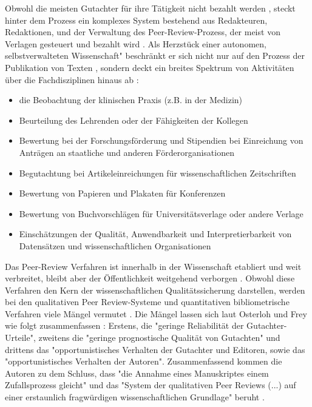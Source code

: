 Obwohl die meisten Gutachter für ihre Tätigkeit nicht bezahlt werden \cite{yiotis_2013_open}, steckt hinter dem Prozess ein komplexes System bestehend aus Redakteuren, Redaktionen, und der Verwaltung des Peer-Review-Prozess, der meist von Verlagen gesteuert und bezahlt wird \cite{Bargheer_2015} \cite{mueller_2009_peerreview} \cite{Baggs_2006}. Als Herzstück einer autonomen, selbstverwalteten Wissenschaft" \cite{suchen_Hornbostel_2006} beschränkt er sich nicht nur auf den Prozess der Publikation von Texten \cite{mueller_2009_peerreview}, sondern deckt ein breites Spektrum von Aktivitäten über die Fachdisziplinen hinaus ab \cite{Lee_2012}:
\begin{itemize}
\item die Beobachtung der klinischen Praxis (z.B. in der Medizin)
\item Beurteilung des Lehrenden oder der Fähigkeiten der Kollegen
\item Bewertung bei der Forschungsförderung und Stipendien bei Einreichung von Anträgen an staatliche und anderen Förderorganisationen
\item Begutachtung bei Artikeleinreichungen für wissenschaftlichen Zeitschriften
\item Bewertung von Papieren und Plakaten für Konferenzen
\item Bewertung von Buchvorschlägen für Universitätsverlage oder andere Verlage
\item Einschätzungen der Qualität, Anwendbarkeit und Interpretierbarkeit von Datensätzen und wissenschaftlichen Organisationen
\end{itemize}

Das Peer-Review Verfahren ist innerhalb in der Wissenschaft etabliert und weit verbreitet, bleibt aber der Öffentlichkeit weitgehend verborgen \cite{Konneker_2013}. Obwohl diese Verfahren den Kern der wissenschaftlichen Qualitätssicherung darstellen, werden bei den qualitativen Peer Review-Systeme und quantitativen bibliometrische Verfahren viele Mängel vermutet \cite{Peters_2014} \cite{Lee_2012} \cite{bar_2009_wissenschaftliche} \cite{osterloh2008anreize} \cite{ware_2008_peer} \cite{Jansen_2007} \cite{smith_1999_opening}. Die Mängel lassen sich laut Osterloh und Frey wie folgt zusammenfassen \cite{osterloh2008anreize}: Erstens, die "geringe Reliabilität der Gutachter-Urteile", zweitens die "geringe prognostische Qualität von Gutachten" und drittens das "opportunistisches Verhalten der Gutachter und Editoren, sowie das "opportunistisches Verhalten der Autoren". Zusammenfassend kommen die Autoren zu dem Schluss, dass "die Annahme eines Manuskriptes einem Zufallsprozess gleicht" und das "System der qualitativen Peer Reviews (...) auf einer erstaunlich fragwürdigen wissenschaftlichen Grundlage" beruht \cite{osterloh2008anreize}.

